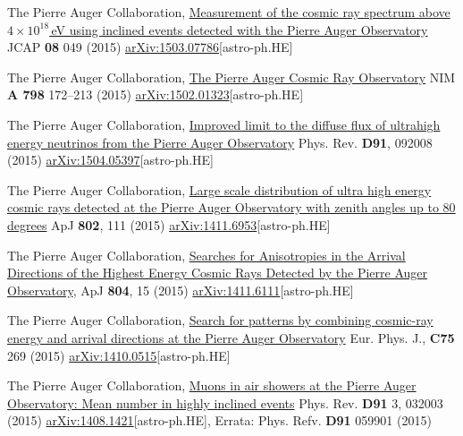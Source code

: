 \begin{etaremune}
\item {}The Pierre Auger Collaboration, \href{http://dx.doi.org/10.1088/1475-7516/2015/08/049}{{Measurement of the cosmic ray spectrum above $4\times 10^{18}$\,eV using inclined events detected with the Pierre Auger Observatory}} JCAP {\bf{08}} 049 (2015) \href{http://arxiv.org/abs/1503.07786}{arXiv:1503.07786}[astro-ph.HE]

\item {}The Pierre Auger Collaboration, \href{http://dx.doi.org/10.1016/j.nima.2015.06.058}{{The Pierre Auger Cosmic Ray Observatory}} NIM {\bf{A 798}} 172--213 (2015) \href{http://arxiv.org/abs/1502.01323}{arXiv:1502.01323}[astro-ph.HE]

\item {}The Pierre Auger Collaboration, \href{http://dx.doi.org/10.1103/PhysRevD.91.092008}{{Improved limit to the diffuse flux of ultrahigh energy neutrinos from the Pierre Auger Observatory}} Phys. Rev. {\bf{D91}}, 092008 (2015) \href{http://arxiv.org/abs/1504.05397}{arXiv:1504.05397}[astro-ph.HE]

\item {}The Pierre Auger Collaboration, \href{http://dx.doi.org/}{{Large scale distribution of ultra high energy cosmic rays detected at the Pierre Auger Observatory with zenith angles up to 80 degrees}} ApJ {\bf{802}}, 111 (2015) \href{http://arxiv.org/abs/1411.6953}{arXiv:1411.6953}[astro-ph.HE]

\item {}The Pierre Auger Collaboration, \href{http://dx.doi.org/}{{Searches for Anisotropies in the Arrival Directions of the Highest Energy Cosmic Rays Detected by the Pierre Auger Observatory}}, ApJ {\bf{804}}, 15 (2015) \href{http://arxiv.org/abs/1411.6111}{arXiv:1411.6111}[astro-ph.HE]

\item {}The Pierre Auger Collaboration, \href{http://dx.doi.org/}{{Search for patterns by combining cosmic-ray energy and arrival directions at the Pierre Auger Observatory}} Eur. Phys. J., {\bf{C75}} 269 (2015) \href{http://arxiv.org/abs/1410.0515}{arXiv:1410.0515}[astro-ph.HE]

\item {}The Pierre Auger Collaboration, \href{http://dx.doi.org/10.1103/PhysRevD.91.032003}{{Muons in air showers at the Pierre Auger Observatory: Mean number in highly inclined events}} Phys. Rev. {\bf{D91}} 3, 032003 (2015) \href{http://arxiv.org/abs/1408.1421}{arXiv:1408.1421}[astro-ph.HE], Errata: Phys. Refv. {\bf{D91}} 059901 (2015)


\end{etaremune}
